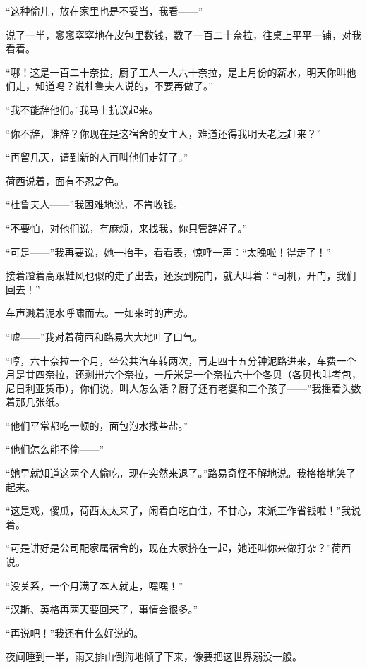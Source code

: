 \par “这种偷儿，放在家里也是不妥当，我看——”
\par 说了一半，窸窸窣窣地在皮包里数钱，数了一百二十奈拉，往桌上平平一铺，对我看着。
\par “哪！这是一百二十奈拉，厨子工人一人六十奈拉，是上月份的薪水，明天你叫他们走，知道吗？说杜鲁夫人说的，不要再做了。”
\par “我不能辞他们。”我马上抗议起来。
\par “你不辞，谁辞？你现在是这宿舍的女主人，难道还得我明天老远赶来？”
\par “再留几天，请到新的人再叫他们走好了。”
\par 荷西说着，面有不忍之色。
\par “杜鲁夫人——”我困难地说，不肯收钱。
\par “不要怕，对他们说，有麻烦，来找我，你只管辞好了。”
\par “可是——”我再要说，她一抬手，看看表，惊呼一声：“太晚啦！得走了！”
\par 接着蹬着高跟鞋风也似的走了出去，还没到院门，就大叫着：“司机，开门，我们回去！”
\par 车声溅着泥水呼啸而去。一如来时的声势。
\par “嘘——”我对着荷西和路易大大地吐了口气。
\par “哼，六十奈拉一个月，坐公共汽车转两次，再走四十五分钟泥路进来，车费一个月是廿四奈拉，还剩卅六个奈拉，一斤米是一个奈拉六十个各贝（各贝也叫考包，尼日利亚货币），你们说，叫人怎么活？厨子还有老婆和三个孩子——”我摇着头数着那几张纸。
\par “他们平常都吃一顿的，面包泡水撒些盐。”
\par “他们怎么能不偷——”
\par “她早就知道这两个人偷吃，现在突然来退了。”路易奇怪不解地说。我格格地笑了起来。
\par “这是戏，傻瓜，荷西太太来了，闲着白吃白住，不甘心，来派工作省钱啦！”我说着。
\par “可是讲好是公司配家属宿舍的，现在大家挤在一起，她还叫你来做打杂？”荷西说。
\par “没关系，一个月满了本人就走，嘿嘿！”
\par “汉斯、英格再两天要回来了，事情会很多。”
\par “再说吧！”我还有什么好说的。
\par 夜间睡到一半，雨又排山倒海地倾了下来，像要把这世界溺没一般。




